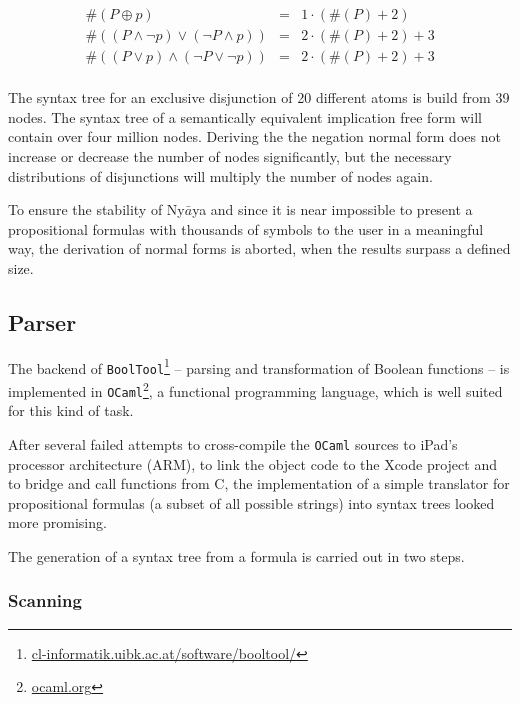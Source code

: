 \begin{eqnarray*}
\#(P \oplus p) & = & 1 \cdot(\#(P) + 2) \\
\#((P \wedge \neg p) \vee  (\neg P \wedge p)) & = & 2 \cdot (\#(P) + 2) + 3 \\
\#((P \vee p) \wedge  (\neg P \vee \neg p)) & = & 2 \cdot (\#(P) + 2) + 3 \\
\end{eqnarray*}

The syntax tree for an exclusive disjunction of 20 different atoms is build from 39 nodes.
The syntax tree of a semantically equivalent implication free form will contain over four million nodes.
Deriving the the negation normal form does not increase or decrease the number of nodes significantly,
but the necessary distributions of disjunctions will multiply the number of nodes again.

To ensure the stability of Ny$\bar{a}$ya 
and since it is near impossible 
to present a propositional formulas with thousands of symbols 
to the user in a meaningful way, 
the derivation of normal forms is aborted, when the results surpass a defined size.



\subsection{Parser}
\label{subsec:Parser}

The backend of \verb+BoolTool+\footnote{
\href{http://cl-informatik.uibk.ac.at/software/booltool/}{cl-informatik.uibk.ac.at/software/booltool/}} 
– parsing and transformation of Boolean functions – 
is implemented in \verb+OCaml+\footnote{
\href{http://ocaml.org}{ocaml.org}}, 
a functional programming language, which is well suited for this kind of task.

After several failed attempts to cross-compile the \verb+OCaml+ sources to iPad's processor architecture (ARM),
to link the object code to the Xcode project and to bridge and call functions from C, 
the implementation of a simple translator 
for propositional formulas (a subset of all possible strings)
into syntax trees looked more promising. 

The generation of a syntax tree from a formula  is carried out in two steps. 

\subsubsection{Scanning}

